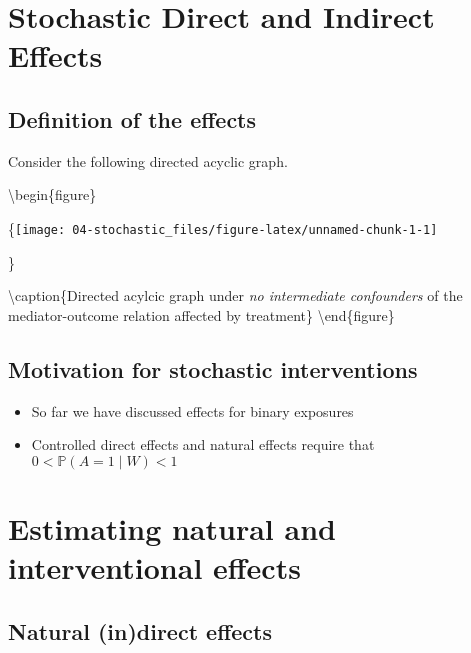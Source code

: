 \documentclass[
  12pt, krantz2,
]{book}
\providecommand{\tightlist}{%
  \setlength{\itemsep}{0pt}\setlength{\parskip}{0pt}}
\theoremstyle{definition}
\theoremstyle{definition}
\theoremstyle{definition}
\renewcommand{\P}{\mathbb{P}}
\newcommand{\1}{\mathbbm{1}}
\begin{document}
\hypertarget{stochastic}{%
\chapter{Stochastic Direct and Indirect Effects}\label{stochastic}}

\hypertarget{definition-of-the-effects-1}{%
\section{Definition of the effects}\label{definition-of-the-effects-1}}

Consider the following directed acyclic graph.

\textbackslash begin\{figure\}

\{\centering \texttt{[image: 04-stochastic\_files/figure-latex/unnamed-chunk-1-1]}

\}

\textbackslash caption\{Directed acylcic graph under \emph{no intermediate confounders} of the mediator-outcome relation affected by treatment\}\label{fig:unnamed-chunk-1}
\textbackslash end\{figure\}

\hypertarget{motivation-for-stochastic-interventions}{%
\section{Motivation for stochastic interventions}\label{motivation-for-stochastic-interventions}}

\begin{itemize}
\tightlist
\item
  So far we have discussed effects for binary exposures
\item
  Controlled direct effects and natural effects require that \(0 < \P(A=1\mid W) < 1\)
\end{itemize}

\hypertarget{estimating-natural-and-interventional-effects}{%
\chapter{Estimating natural and interventional effects}\label{estimating-natural-and-interventional-effects}}

\hypertarget{natural-indirect-effects}{%
\section{Natural (in)direct effects}\label{natural-indirect-effects}}
\end{document}
